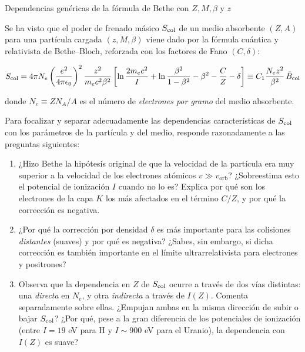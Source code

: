\begin{Ejercicio}{Dependencias genéricas de la fórmula de Bethe con $Z, M, \beta$ y $z$} \label{Ej:02.04}
    

Se ha visto que el poder de frenado másico $S_\text{\text{col}}$ de un medio absorbente $(Z,A)$ para una 
partícula cargada $(z, M, \beta)$ viene dado por la fórmula cuántica y relativista de Bethe--Bloch, 
reforzada con los factores de Fano $(C,\delta)$:

\[
S_\text{\text{col}} = 4\pi N_e \left( \frac{e^2}{4\pi \epsilon_0} \right)^2 
\frac{z^2}{m_e c^2 \beta^2} 
\left[ \ln \frac{2 m_e c^2}{I} + \ln \frac{\beta^2}{1 - \beta^2} - \beta^2 - \frac{C}{Z} - \delta \right]
\equiv C_1 \frac{N_e z^2}{\beta^2} \, \bar{B}_\text{\text{col}}
\]

donde $N_e \equiv ZN_A/A$ es el número de \emph{electrones por gramo} del medio absorbente.  

Para focalizar y separar adecuadamente las dependencias características de $S_\text{\text{col}}$ con los  parámetros de la partícula y del medio, responde razonadamente a las preguntas siguientes:

\begin{enumerate}[label=\alph*)]

\item ¿Hizo Bethe la hipótesis original de que la velocidad de la partícula era muy superior a la velocidad de los electrones atómicos $v \gg v_\text{orb}$?  
¿Sobreestima esto el potencial de ionización $I$ cuando no lo es?   Explica por qué son los electrones de la capa $K$ los más afectados en el término $C/Z$, y por qué la corrección es negativa.

\item ¿Por qué la corrección por densidad $\delta$ es más importante para las colisiones 
\emph{distantes} (suaves) y por qué es negativa?  
¿Sabes, sin embargo, si dicha corrección es también importante en el límite ultrarrelativista para electrones y positrones?

\item Observa que la dependencia en $Z$ de $S_\text{\text{col}}$ ocurre a través de dos vías distintas: 
una \emph{directa} en $N_e$, y otra \emph{indirecta} a través de $I(Z)$.  
Comenta separadamente sobre ellas.  
¿Empujan ambas en la misma dirección de subir o bajar $S_\text{\text{col}}$?  
¿Por qué, pese a la gran diferencia de los potenciales de ionización (entre $I=19$ eV para H y $I\sim 900$ eV para el Uranio), la dependencia con $I(Z)$ es suave?


\end{enumerate}
\end{Ejercicio}
